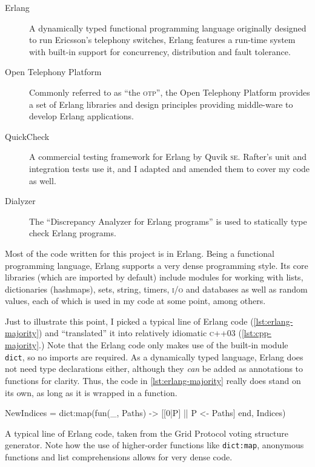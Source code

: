 \documentclass[draft,11pt,chapterprefix=true,toc=bibliography,numbers=noendperiod,
               footnotes=multiple,twoside]{scrreprt}
\begin{document}
\begin{description}
    \item[Erlang] A dynamically typed functional programming language originally designed to run Ericsson's telephony switches, Erlang features a run-time system with built-in support for concurrency, distribution and fault tolerance.
    \item[Open Telephony Platform] Commonly referred to as \enquote{the \textsc{otp}}, the Open Telephony Platform provides a set of Erlang libraries and design principles providing middle-ware to develop Erlang applications.
    \item[QuickCheck] A commercial testing framework for Erlang by Quvik \textsc{se}. Rafter's unit and integration tests use it, and I adapted and amended them to cover my code as well.
    \item[Dialyzer] The \enquote{Discrepancy Analyzer for Erlang programs} is used to statically type check Erlang programs.
\end{description}


Most of the code written for this project is in Erlang. Being a functional programming language, Erlang supports a very dense programming style. Its core libraries (which are imported by default) include modules for working with lists, dictionaries (hashmaps), sets, string, timers, \textsc{i/o} and databases as well as random values, each of which is used in my code at some point, among others.

Just to illustrate this point, I picked a typical line of Erlang code (\autoref{lst:erlang-majority}) and \enquote{translated} it into relatively idiomatic \textsc{c}++03 (\autoref{lst:cpp-majority}.) Note that the Erlang code only makes use of the built-in module \texttt{dict}, so no imports are required. As a dynamically typed language, Erlang does not need type declarations either, although they \emph{can} be added as annotations to functions for clarity. Thus, the code in \autoref{lst:erlang-majority} really does stand on its own, as long as it is wrapped in a function.

\begin{listing}[p]
    \begin{erlangcode}
NewIndices = dict:map(fun(_, Paths) -> [[0|P] || P <- Paths] end, Indices)
    \end{erlangcode}
    \caption{A typical line of Erlang code, taken from the Grid Protocol voting structure generator. Note how the use of higher-order functions like \texttt{dict:map}, anonymous functions and list comprehensions allows for very dense code.}
    \label{lst:erlang-majority}
\end{listing}
\end{document}
